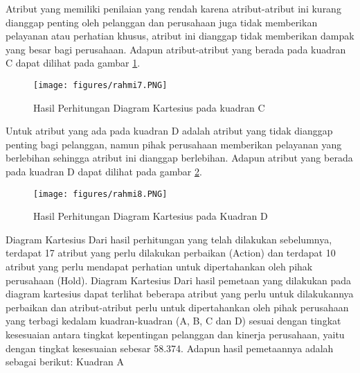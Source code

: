 Atribut yang memiliki penilaian yang rendah karena atribut-atribut ini kurang dianggap penting oleh pelanggan dan perusahaan juga tidak memberikan pelayanan atau perhatian khusus, 
atribut ini dianggap tidak memberikan dampak yang besar bagi perusahaan.
Adapun atribut-atribut yang berada pada kuadran C dapat dilihat pada gambar \ref{rahmi7}.

\begin{figure}[ht]
	\centerline{\texttt{[image: figures/rahmi7.PNG]}}
	\caption{Hasil Perhitungan Diagram Kartesius pada kuadran C}
	\label{rahmi7}
	\end{figure}

Untuk atribut yang ada pada kuadran D adalah atribut yang tidak dianggap penting bagi pelanggan, namun pihak perusahaan memberikan pelayanan yang berlebihan 
sehingga atribut ini dianggap berlebihan.
Adapun atribut yang berada pada kuadran D dapat dilihat pada gambar \ref{rahmi8}.	
\begin{figure}[ht]
	\centerline{\texttt{[image: figures/rahmi8.PNG]}}
	\caption{Hasil Perhitungan Diagram Kartesius pada Kuadran D}
	\label{rahmi8}
	\end{figure}



Diagram Kartesius
Dari hasil perhitungan yang telah dilakukan sebelumnya, terdapat 17 atribut yang perlu dilakukan perbaikan (Action) dan terdapat 10 atribut yang perlu mendapat
perhatian untuk dipertahankan oleh pihak perusahaan (Hold). Diagram Kartesius Dari hasil pemetaan yang dilakukan pada diagram kartesius dapat terlihat beberapa
atribut yang perlu untuk dilakukannya perbaikan dan atribut-atribut perlu untuk dipertahankan oleh pihak perusahaan yang terbagi kedalam kuadran-kuadran (A, B, C
dan D) sesuai dengan tingkat kesesuaian antara tingkat kepentingan pelanggan dan kinerja perusahaan, yaitu dengan tingkat kesesuaian sebesar 58.374.
Adapun hasil pemetaannya adalah sebagai berikut:
Kuadran A

